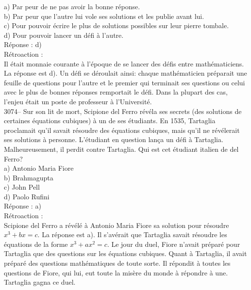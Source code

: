 \documentclass[letterpaper, 12pt]{article}
\begin{document}
a) Par peur de ne pas avoir la bonne r\'eponse.\\
b) Par peur que l'autre lui vole ses solutions et les publie avant lui.\\
c) Pour pouvoir \'ecrire le plus de solutions possibles sur leur pierre tombale.\\
d) Pour pouvoir lancer un d\'efi \`a l'autre.\\

R\'eponse : d)\\

R\'etroaction :\\
Il \'etait monnaie courante \`a l'\'epoque de se lancer des d\'efis entre math\'ematiciens. La r\'eponse est d). Un d\'efi se d\'eroulait ainsi: chaque math\'ematicien pr\'eparait une feuille de questions pour l'autre et le premier qui terminait ses questions ou celui avec le plus de bonnes r\'eponses remportait le d\'efi. Dans la plupart des cas, l'enjeu \'etait un poste de professeur \`a l'Universit\'e.\\



3074-- Sur son lit de mort, Scipione del Ferro r\'ev\'ela ses secrets (des solutions de certaines \'equations cubiques) \`a un de ses \'etudiants. En 1535, Tartaglia proclamait qu'il savait r\'esoudre des \'equations cubiques, mais qu'il ne r\'ev\'elerait ses solutions \`a personne. L'\'etudiant en question lan\c ca un d\'efi \`a Tartaglia. Malheureusement, il perdit contre Tartaglia. Qui est cet \'etudiant italien de del Ferro?\\

a) Antonio Maria Fiore\\
b) Brahmagupta\\
c) John Pell\\
d) Paolo Rufini\\

R\'eponse : a)\\

R\'etroaction :\\
Scipione del Ferro a r\'ev\'el\'e \`a Antonio Maria Fiore sa solution pour r\'esoudre $x^{3} + bx = c$. La r\'eponse est a). Il s'av\'erait que Tartaglia savait r\'esoudre les \'equations de la forme $x^{3} + ax^{2} = c$. Le jour du duel, Fiore n'avait pr\'epar\'e pour Tartaglia que des questions sur les \'equations cubiques. Quant \`a Tartaglia, il avait pr\'epar\'e des questions math\'ematiques de toute sorte. Il r\'epondit \`a toutes les questions de Fiore, qui lui, eut toute la mis\`ere du monde \`a r\'epondre \`a une. Tartaglia gagna ce duel.\\
\end{document}
